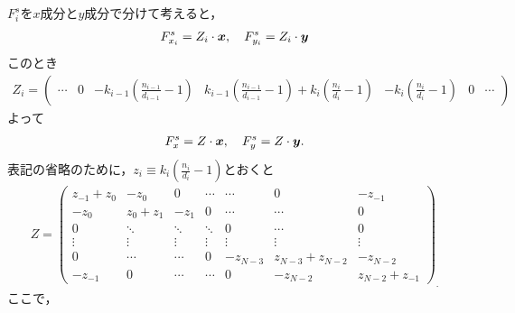 $F_{i}^{s}$を$x$成分と$y$成分で分けて考えると，
\begin{eqnarray*}
  F_{x_{i}}^{s} = Z_{i} \cdot \mbox{\boldmath \(x\)}, \quad F_{y_{i}}^{s} = Z_{i} \cdot \mbox{\boldmath \(y\)}
\end{eqnarray*}
このとき
\begin{eqnarray*}
  Z_{i} = \left(
    \begin{array}{ccccccc}
      \cdots &  0 & -k_{i-1}\left(\frac{n_{i-1}}{d_{i-1}} - 1 \right) & k_{i-1}\left(\frac{n_{i-1}}{d_{i-1}} - 1\right) + k_{i}\left(\frac{n_{i}}{d_{i}}-1\right) & - k_{i}\left(\frac{n_{i}}{d_{i}}-1\right) & 0 & \cdots
    \end{array}
    \right)
\end{eqnarray*}
よって
\begin{eqnarray*}
  F_{x}^{s} = Z \cdot \mbox{\boldmath \(x\)}, \quad F_{y}^{s} = Z \cdot \mbox{\boldmath \(y\)}.
\end{eqnarray*}
表記の省略のために，$z_{i} \equiv k_{i}\left( \frac{n_{i}}{d_{i}} - 1\right)$とおくと
\begin{eqnarray*}
  Z = \left(
    \begin{array}{ccccccc}
      z_{-1} + z_{0} & -z_{0}        & 0      & \cdots & \cdots   & 0                 & -z_{-1}          \\
      -z_{0}         & z_{0} + z_{1} & -z_{1} & 0      & \cdots   & \cdots            & 0                \\
      0              & \ddots        & \ddots & \ddots & 0        & \cdots            & 0                \\
      \vdots         & \vdots        & \vdots & \vdots & \vdots   & \vdots            & \vdots           \\
      0              & \cdots        & \cdots & 0      & -z_{N-3} & z_{N-3} + z_{N-2} & -z_{N-2}         \\
      -z_{-1}        & 0             & \cdots & \cdots & 0        & -z_{N-2}          & z_{N-2} + z_{-1}
    \end{array}
  \right)_{.}
\end{eqnarray*}
ここで，
